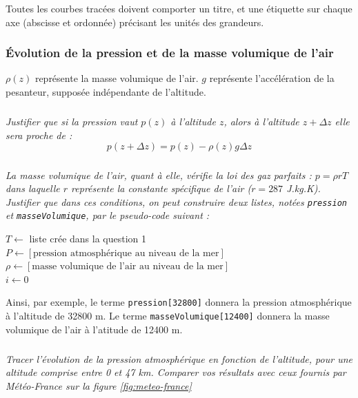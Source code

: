 \documentclass[10pt]{article}
\begin{document}
\begin{rem}
Toutes les courbes tracées doivent comporter un titre, et une étiquette sur chaque axe (abscisse et ordonnée) précisant les unités des grandeurs.
\end{rem}

\subsubsection*{\'Evolution de la pression et de la masse volumique de l'air}
$\rho(z)$ représente la masse volumique de l'air. $g$ représente l'accélération de la pesanteur, supposée indépendante de l'altitude.

\subparagraph{}
\textit{Justifier que si la pression vaut $p(z)$ à l'altitude $z$, alors à l'altitude $z+\Delta z$ elle sera proche de :
\[p(z+\Delta z)=p(z)-\rho(z) g \Delta z\] }

\subparagraph{}\textit{
La masse volumique de l'air, quant à elle, vérifie la loi des gaz parfaits : $p=\rho r T$ dans laquelle $r$ représente la constante spécifique de l'air ($r=287$ J.kg.K). Justifier que dans ces conditions, on peut construire deux listes, notées
\texttt{pression} et \texttt{masseVolumique}, par le pseudo-code suivant :}

\begin{pseudo}
\begin{algorithm}[H]
$T\gets$ liste crée dans la question 1\\
$P \gets [\text{pression atmosphérique au niveau de la mer}]$\\
$\rho \gets [\text{masse volumique de l'air au niveau de la mer}]$\\
$i\gets 0$\\
\end{algorithm}
\end{pseudo}

Ainsi, par exemple, le terme \texttt{pression[32800]} donnera la pression atmosphérique à l'altitude de 32800 m. Le terme \texttt{masseVolumique[12400]} donnera la masse volumique de l'air à l'atitude de 12400 m.


\subparagraph{}
\textit{Tracer l'évolution de la pression atmosphérique en fonction de l'altitude, pour une altitude comprise entre 0 et 47 km. Comparer vos résultats avec ceux fournis par Météo-France sur la figure \ref{fig:meteo-france}}
\end{document}
